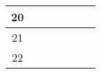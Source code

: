 \begin{table}[ht]
{\begin{tabular}{cllllcc}
	\multicolumn{1}{|c|}{20}          & \multicolumn{1}{l|}{}           & \multicolumn{1}{l|}{}                                                                                                                                                                                             & \multicolumn{1}{l|}{}                                                                                                                                     & \multicolumn{1}{l|}{}                                                                                                                                                                                                                & \multicolumn{1}{c|}{}                                                                                & \multicolumn{1}{c|}{}                                                                                 \\ \hline
	\multicolumn{1}{|c|}{21}          & \multicolumn{1}{l|}{}           & \multicolumn{1}{l|}{}                                                                                                                                                                                             & \multicolumn{1}{l|}{}                                                                                                                                     & \multicolumn{1}{l|}{}                                                                                                                                                                                                                & \multicolumn{1}{c|}{}                                                                                & \multicolumn{1}{c|}{}                                                                                 \\ \hline
	\multicolumn{1}{|c|}{22}          & \multicolumn{1}{l|}{}           & \multicolumn{1}{l|}{}                                                                                                                                                                                             & \multicolumn{1}{l|}{}                                                                                                                                     & \multicolumn{1}{l|}{}                                                                                                                                                                                                                & \multicolumn{1}{c|}{}                                                                                & \multicolumn{1}{c|}{}                                                                                 \\ \hline

\end{tabular}}
\end{table}
